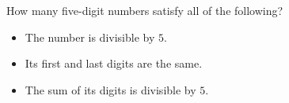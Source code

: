 How many five-digit numbers satisfy all of the following?
\begin{itemize}
\item The number is divisible by $5$.
\item Its first and last digits are the same.
\item The sum of its digits is divisible by $5$.
\end{itemize}
